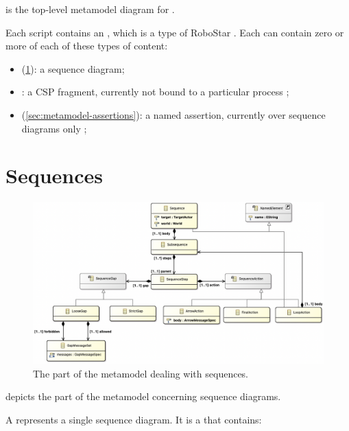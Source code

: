  is the top-level metamodel diagram for \langname.

Each \langname{} script contains an \mrapackage, which is a type of RoboStar
\mbasicpackage.  Each \mrapackage{} can contain zero or more of each of these
types of content:

\begin{itemize}
\item
	\msequence{}
	(\cref{sec:metamodel-sequences}):
	a sequence diagram;
\item
	\mcspfragment:
	a CSP fragment, currently not bound to a particular process
	;
\item
	\mnamedassertion{}
	(\cref{sec:metamodel-assertions}):
	a named assertion, currently over sequence diagrams only
	;
\end{itemize}



\section{Sequences}\label{sec:metamodel-sequences}

\begin{figure}
	\centering
	\includegraphics[width=\textwidth]{diagrams/sequences.png}
	\caption{The part of the \langname{} metamodel dealing with sequences.}
	\label{fig:metamodel-sequences}
\end{figure}

 depicts the part of the metamodel concerning
sequence diagrams.

A \msequence{} represents a single sequence diagram.  It is a \mnamedelement{}
that contains:

